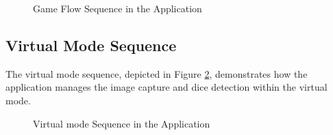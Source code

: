 \begin{figure}[ht!]
    \centering
    
    \caption{Game Flow Sequence in the Application}
    \label{fig:game_flow}
\end{figure}


\subsection{Virtual Mode Sequence}

The virtual mode sequence, depicted in Figure \ref{fig:virtual_mode_flow}, demonstrates how the application manages the image capture and dice detection within the virtual mode.

\begin{figure}[ht!]
    \centering
    
    \caption{Virtual mode Sequence in the Application}
    \label{fig:virtual_mode_flow}
\end{figure}


